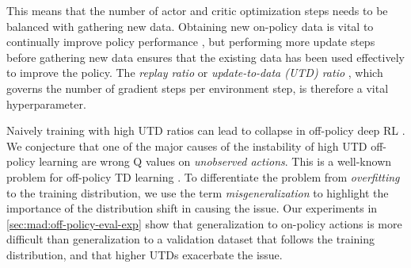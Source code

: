 This means that the number of actor and critic optimization steps needs to be balanced with gathering new data.
Obtaining new on-policy data is vital to continually improve policy performance \parencite{ostrovski2021difficulty}, but performing more update steps before gathering new data ensures that the existing data has been used effectively to improve the policy.
The \emph{replay ratio} \parencite{fedus2020revisiting} or \emph{update-to-data (UTD) ratio} \parencite{nikishin2022primacy}, which governs the number of gradient steps per environment step, is therefore a vital hyperparameter.

Naively training with high UTD ratios can lead to collapse in off-policy deep RL \parencite{nikishin2022primacy}.
We conjecture that one of the major causes of the instability of high UTD off-policy learning are wrong Q values on \emph{unobserved actions}.
This is a well-known problem for off-policy TD learning \parencite{baird1995residual,tsitsiklis1996analysis,sutton2016emphatic,ghosh2020representations}.
To differentiate the problem from \emph{overfitting} to the training distribution, we use the term \emph{misgeneralization} to highlight the importance of the distribution shift in causing the issue.
Our experiments in \autoref{sec:mad:off-policy-eval-exp} show that generalization to on-policy actions is more difficult than generalization to a validation dataset that follows the training distribution, and that higher UTDs exacerbate the issue.

